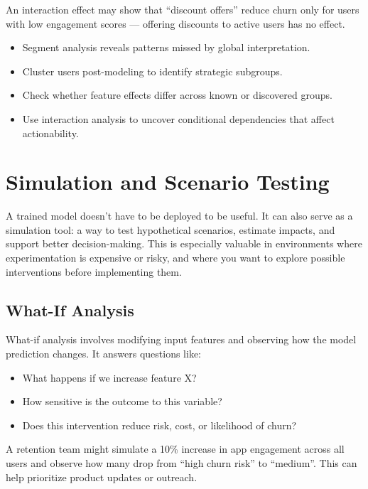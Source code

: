 \documentclass[12pt,openany]{book}
\begin{document}
\begin{examplebox}
An interaction effect may show that ``discount offers'' reduce churn only for users with low engagement scores — offering discounts to active users has no effect.
\end{examplebox}

\begin{summarybox}
\begin{itemize}
  \item Segment analysis reveals patterns missed by global interpretation.
  \item Cluster users post-modeling to identify strategic subgroups.
  \item Check whether feature effects differ across known or discovered groups.
  \item Use interaction analysis to uncover conditional dependencies that affect actionability.
\end{itemize}
\end{summarybox}




\chapter{Simulation and Scenario Testing}

A trained model doesn’t have to be deployed to be useful. It can also serve as a simulation tool: a way to test hypothetical scenarios, estimate impacts, and support better decision-making. This is especially valuable in environments where experimentation is expensive or risky, and where you want to explore possible interventions before implementing them.

\section{What-If Analysis}

What-if analysis involves modifying input features and observing how the model prediction changes. It answers questions like:
\begin{itemize}
  \item What happens if we increase feature X?
  \item How sensitive is the outcome to this variable?
  \item Does this intervention reduce risk, cost, or likelihood of churn?
\end{itemize}

\begin{examplebox}
A retention team might simulate a 10\% increase in app engagement across all users and observe how many drop from ``high churn risk'' to ``medium''. This can help prioritize product updates or outreach.
\end{examplebox}
\end{document}
